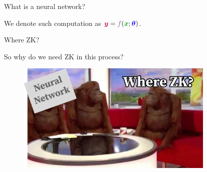 \documentclass{zkdl-presentation-template}
\begin{document}
\begin{frame}{What is a neural network?}
{            \begin{center}
                \large We denote such computation as $\textcolor{purple}{\boldsymbol{y}} = \textcolor{gray!80!black}{f}(\textcolor{green!60!black}{\boldsymbol{x}};\textcolor{blue}{\boldsymbol{\theta}})$.
            \end{center}
        }
    \end{frame}

    \begin{frame}{Where ZK?}
        \begin{center}
            So why do we need ZK in this process?
        \end{center}
        \begin{figure}
            \centering
            \includegraphics[width=0.85\textwidth]{images/where.pdf}
        \end{figure}
    \end{frame}
\end{document}
